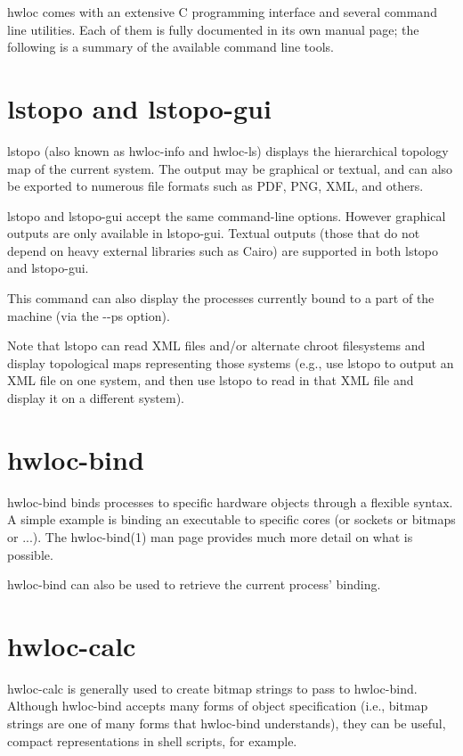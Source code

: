 hwloc comes with an extensive C programming interface and several command line utilities. Each of them is fully documented in its own manual page; the following is a summary of the available command line tools.\hypertarget{a00002_cli_lstopo}{}\section{lstopo and lstopo-\/gui}\label{a00002_cli_lstopo}
lstopo (also known as hwloc-\/info and hwloc-\/ls) displays the hierarchical topology map of the current system. The output may be graphical or textual, and can also be exported to numerous file formats such as PDF, PNG, XML, and others.

lstopo and lstopo-\/gui accept the same command-\/line options. However graphical outputs are only available in lstopo-\/gui. Textual outputs (those that do not depend on heavy external libraries such as Cairo) are supported in both lstopo and lstopo-\/gui.

This command can also display the processes currently bound to a part of the machine (via the -\/-\/ps option).

Note that lstopo can read XML files and/or alternate chroot filesystems and display topological maps representing those systems (e.g., use lstopo to output an XML file on one system, and then use lstopo to read in that XML file and display it on a different system).\hypertarget{a00002_cli_hwloc_bind}{}\section{hwloc-\/bind}\label{a00002_cli_hwloc_bind}
hwloc-\/bind binds processes to specific hardware objects through a flexible syntax. A simple example is binding an executable to specific cores (or sockets or bitmaps or ...). The hwloc-\/bind(1) man page provides much more detail on what is possible.

hwloc-\/bind can also be used to retrieve the current process' binding.\hypertarget{a00002_cli_hwloc_calc}{}\section{hwloc-\/calc}\label{a00002_cli_hwloc_calc}
hwloc-\/calc is generally used to create bitmap strings to pass to hwloc-\/bind. Although hwloc-\/bind accepts many forms of object specification (i.e., bitmap strings are one of many forms that hwloc-\/bind understands), they can be useful, compact representations in shell scripts, for example.


